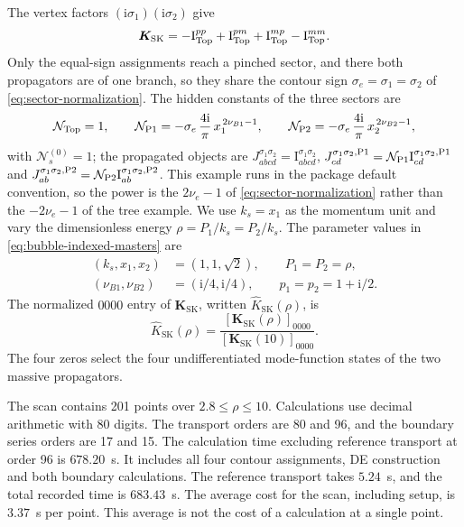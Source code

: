\documentclass[11pt,a4paper]{article}
\newcommand{\ii}{\mathrm i}
\newcommand{\cN}{\mathcal N}
\begin{document}
The vertex factors $(\ii\sigma_1)(\ii\sigma_2)$ give
\begin{equation}
  \bm K_{\mathrm{SK}}=-\bm{\text I}^{pp}_{\rm Top}+\bm{\text I}^{pm}_{\rm Top}
  +\bm{\text I}^{mp}_{\rm Top}-\bm{\text I}^{mm}_{\rm Top}.
  \label{eq:bubble-sk}
\end{equation}
Only the equal-sign assignments reach a pinched sector, and there both propagators are of one
branch, so they share the contour sign $\sigma_e=\sigma_1=\sigma_2$ of
\eqref{eq:sector-normalization}. The hidden constants of the three sectors are
\begin{equation}
  \cN_{\rm Top}=1,\qquad
  \cN_{\rm P1}=-\sigma_e\,\frac{4\ii}{\pi}\,x_1^{\,2\nu_{B1}-1},\qquad
  \cN_{\rm P2}=-\sigma_e\,\frac{4\ii}{\pi}\,x_2^{\,2\nu_{B2}-1},
  \label{eq:bubble-sector-normalizations}
\end{equation}
with $\cN_s^{(0)}=1$; the propagated objects are
$J^{\sigma_1\sigma_2}_{abcd}=\text{I}^{\sigma_1\sigma_2}_{abcd}$,
$J^{\sigma_1\sigma_2,{\rm P1}}_{cd}=\cN_{\rm P1}\text{I}^{\sigma_1\sigma_2,{\rm P1}}_{cd}$ and
$J^{\sigma_1\sigma_2,{\rm P2}}_{ab}=\cN_{\rm P2}\text{I}^{\sigma_1\sigma_2,{\rm P2}}_{ab}$.
This example runs in the package default convention, so the power is the
$2\nu_e-1$ of \eqref{eq:sector-normalization} rather than the $-2\nu_e-1$ of the tree example.
We use $k_s=x_1$ as the momentum unit and vary the dimensionless energy
$\rho=P_1/k_s=P_2/k_s$. The parameter values in
\eqref{eq:bubble-indexed-masters} are
\begin{equation}
 \begin{aligned}
 (k_s,x_1,x_2)&=(1,1,\sqrt2),\qquad P_1=P_2=\rho,\\
 (\nu_{B1},\nu_{B2})&=(\ii/4,\ii/4),\qquad
 p_1=p_2=1+\ii/2.
 \end{aligned}
 \label{eq:bubble-parameters}
\end{equation}
The normalized $0000$ entry of $\bm K_{\mathrm{SK}}$, written $\widehat K_{\mathrm{SK}}(\rho)$, is
\begin{equation}
  \widehat K_{\mathrm{SK}}(\rho)
  =\frac{[\bm K_{\mathrm{SK}}(\rho)]_{0000}}
  {[\bm K_{\mathrm{SK}}(10)]_{0000}}.
  \label{eq:bubble-normalized}
\end{equation}
The four zeros select the four undifferentiated mode-function states of the two massive propagators.

The scan contains 201 points over $2.8\leq\rho\leq10$.
Calculations use decimal arithmetic with 80 digits. The transport orders are
80 and 96, and the boundary series orders are 17 and 15.
The calculation time excluding reference transport at order 96 is $678.20$~s.
It includes all four contour assignments, DE construction and both
boundary calculations.
The reference transport takes $5.24$~s, and the total recorded time is
$683.43$~s.
The average cost for the scan, including setup, is $3.37$~s per point.
This average is not the cost of a calculation at a single point.
\end{document}
